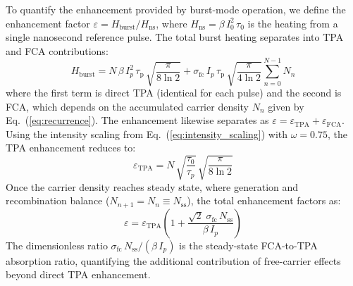 \documentclass{optica-article}
\begin{document}
To quantify the enhancement provided by burst-mode operation, we define the enhancement factor $\varepsilon = H_{\text{burst}}/H_{\text{ns}}$, where $H_{\text{ns}} = \beta\,I_0^2\,\tau_0$ is the heating from a single nanosecond reference pulse. The total burst heating separates into TPA and FCA contributions:
\begin{equation}
H_{\text{burst}} = N\,\beta\,I_p^2\,\tau_\text{p}\,\sqrt{\frac{\pi}{8\ln 2}} + \sigma_\text{fc}\,I_p\,\tau_\text{p}\,\sqrt{\frac{\pi}{4\ln 2}} \sum_{n=0}^{N-1} N_n
\label{eq:heat_fca_burst}
\end{equation}
where the first term is direct TPA (identical for each pulse) and the second is FCA, which depends on the accumulated carrier density $N_n$ given by Eq.~(\ref{eq:recurrence}). The enhancement likewise separates as $\varepsilon = \varepsilon_\text{TPA} + \varepsilon_\text{FCA}$. Using the intensity scaling from Eq.~(\ref{eq:intensity_scaling}) with $\omega = 0.75$, the TPA enhancement reduces to:
\begin{equation}
\varepsilon_\text{TPA} = N\,\sqrt{\frac{\tau_0}{\tau_p}}\,\sqrt{\frac{\pi}{8\ln 2}}
\label{eq:enhancement_tpa}
\end{equation}
Once the carrier density reaches steady state, where generation and recombination balance ($N_{n+1} = N_n \equiv N_\text{ss}$), the total enhancement factors as:
\begin{equation}
\varepsilon = \varepsilon_\text{TPA}\!\left(1 + \frac{\sqrt{2}\;\sigma_\text{fc}\,N_\text{ss}}{\beta\,I_p}\right)
\label{eq:enhancement_fca}
\end{equation}
The dimensionless ratio $\sigma_\text{fc}\,N_\text{ss}/(\beta\,I_p)$ is the steady-state FCA-to-TPA absorption ratio, quantifying the additional contribution of free-carrier effects beyond direct TPA enhancement.
\end{document}
